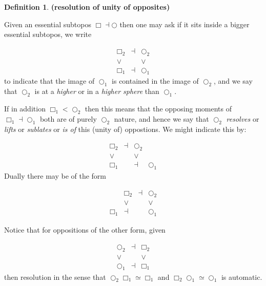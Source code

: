 \documentclass[12pt,titlepage]{article}
\newcommand{\itexarray}[1]{\begin{matrix}#1\end{matrix}}
\newcommand{\lt}{<}
\theoremstyle{plain}
\theoremstyle{definition}
\newtheorem{defn}{Definition}
\theoremstyle{remark}
\begin{document}
\begin{defn}
\label{ResolutionOfOpposition}\hypertarget{ResolutionOfOpposition}{}
\textbf{(resolution of unity of opposites)}

Given an essential subtopos $\Box \dashv \bigcirc$ then one may ask if it sits inside a bigger essential subtopos, we write

\begin{displaymath}
\itexarray{
     \Box_2 &\dashv& \bigcirc_2
     \\
     \vee && \vee
     \\
     \Box_1 &\dashv& \bigcirc_1
  }
\end{displaymath}
to indicate that the image of $\bigcirc_1$ is contained in the image of $\bigcirc_2$, and we say that $\bigcirc_2$ is at a \emph{higher } or in a \emph{higher sphere} than $\bigcirc_1$.

If in addition $\Box_1 \lt \bigcirc_2$ then this means that the opposing moments of $\Box_1 \dashv \bigcirc_1$ both are of purely $\bigcirc_2$ nature, and hence we say that $\bigcirc_2$ \emph{resolves} or \emph{lifts} or \emph{sublates} or \emph{is  of} this (unity of) oppostions. We might indicate this by:

\begin{displaymath}
\itexarray{
     \Box_2 &\dashv& \bigcirc_2
     \\
     \vee && \vee
     \\
     \Box_1 & &\dashv& \bigcirc_1
  }
\end{displaymath}
Dually there may be  of the form

\begin{displaymath}
\itexarray{
     & \Box_2 &\dashv& \bigcirc_2
     \\
     & \vee && \vee
     \\
     \Box_1 &\dashv& & \bigcirc_1
  }
\end{displaymath}
\end{defn}
Notice that for oppositions of the other form, given

\begin{displaymath}
\itexarray{
     \bigcirc_2 &\dashv& \Box_2
     \\
     \vee && \vee
     \\
     \bigcirc_1 &\dashv& \Box_1
  }
\end{displaymath}
then resolution in the sense that $\bigcirc_2 \Box _1 \simeq \Box_1$ and $\Box_2 \bigcirc_1 \simeq \bigcirc_1$ is automatic.
\end{document}
